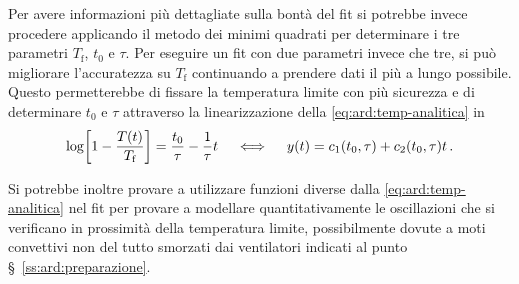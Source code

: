         Per avere informazioni più dettagliate sulla bontà del fit si potrebbe invece procedere applicando il metodo dei minimi quadrati per determinare i tre parametri $T_\text{f}$, $t_0$ e $\tau$. Per eseguire un fit con due parametri invece che tre, si può migliorare l'accuratezza su $T_\text{f}$ continuando a prendere dati il più a lungo possibile. Questo permetterebbe di fissare la temperatura limite con più sicurezza e di determinare $t_0$ e $\tau$ attraverso la linearizzazione della \eqref{eq:ard:temp-analitica} in
        \begin{equation*}
            \log\!\bqty{1-\frac{T\pqty{t}}{T_\text{f}}} = \frac{t_0}{\tau} - \frac{1}{\tau}t 
            \quad\iff\quad 
            y\pqty{t} = c_1\pqty{t_0,\tau} + c_2\pqty{t_0,\tau}t
            \myperiod
        \end{equation*}

        Si potrebbe inoltre provare a utilizzare funzioni diverse dalla \eqref{eq:ard:temp-analitica} nel fit per provare a modellare quantitativamente le oscillazioni che si verificano in prossimità della temperatura limite, possibilmente dovute a moti convettivi non del tutto smorzati dai ventilatori indicati al punto \S~\ref{ss:ard:preparazione}.
        